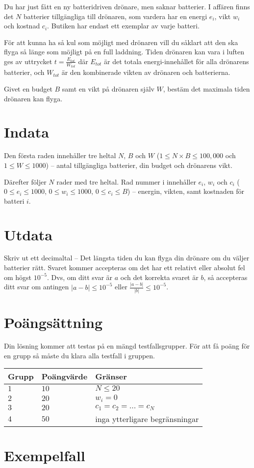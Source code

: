 
Du har just fått en ny batteridriven drönare, men saknar batterier.
I affären finns det $N$ batterier tillgängliga till drönaren,
som vardera har en energi $e_i$, vikt $w_i$ och kostnad $c_i$.
Butiken har endast ett exemplar av varje batteri.

För att kunna ha så kul som möjligt med drönaren vill du såklart att den ska
flyga så länge som möjligt på en full laddning.
Tiden drönaren kan vara i luften ges av uttrycket $t = \frac{E_{tot}}{W_{tot}}$ där $E_{tot}$
är det totala energi-innehållet för alla drönarens batterier, och $W_{tot}$ är den kombinerade vikten av drönaren och batterierna. 

Givet en budget $B$ samt en vikt på drönaren själv $W$, bestäm
det maximala tiden drönaren kan flyga.


\section*{Indata}
Den första raden innehåller tre heltal $N$, $B$ och $W$
($1 \le N\times B \le 100,000$ och $1\le W \le 1000$) -- antal tillgängliga batterier, din budget och drönarens vikt.

Därefter följer $N$ rader med tre heltal. Rad nummer i innehåller $e_i$,
$w_i$ och $c_i$ ($0 \le e_i \le 1000$, $0 \le w_i \le 1000$, $0 \le c_i \le B$) 
-- energin, vikten, samt kostnaden för batteri $i$.

\section*{Utdata}
Skriv ut ett decimaltal -- Det längsta tiden du kan flyga din drönare om du väljer batterier rätt. 
Svaret kommer accepteras om det har ett relativt eller absolut fel om högst $10^{-5}$.
Dvs, om ditt svar är $a$ och det korrekta svaret är $b$, så accepteras ditt svar om
antingen $|a-b| \le 10^{-5}$ eller $\frac{|a-b|}{|b|} \le 10^{-5}$.

\section*{Poängsättning}
Din lösning kommer att testas på en mängd testfallsgrupper.
För att få poäng för en grupp så måste du klara alla testfall i gruppen.

\noindent
\begin{tabular}{| l | l | l |}
  \hline
  Grupp & Poängvärde & Gränser \\ \hline
  $1$   & $10$       & $N \leq 20$ \\ \hline
  $2$   & $20$       & $w_i = 0$ \\ \hline
  $3$   & $20$       & $c_1 = c_2 = ... = c_N$ \\ \hline
  $4$   & $50$       & inga ytterligare begränsningar \\ \hline
\end{tabular}

\section*{Exempelfall}
